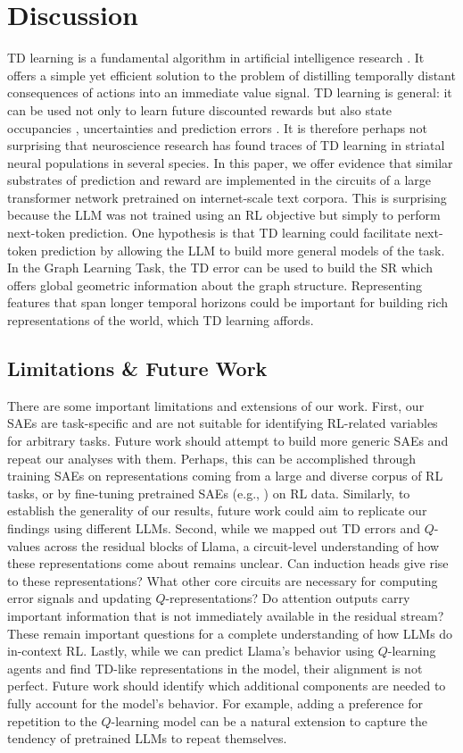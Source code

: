 \documentclass{article}
\begin{document}
\section{Discussion}
TD learning is a fundamental algorithm in artificial intelligence research \citep{sutton1987temporal,sutton_reinforcement_2018, mnih2015human}. It offers a simple yet efficient solution to the problem of distilling temporally distant consequences of actions into an immediate value signal. TD learning is general: it can be used not only to learn future discounted rewards but also state occupancies \citep{dayan_improving_1993}, uncertainties \citep{guez2012efficient} and prediction errors \citep{burda2018exploration, saanum2024reinforcement}. It is therefore perhaps not surprising that neuroscience research has found traces of TD learning in striatal neural populations in several species. In this paper, we offer evidence that similar substrates of prediction and reward are implemented in the circuits of a large transformer network pretrained on internet-scale text corpora. This is surprising because the LLM was not trained using an RL objective but simply to perform next-token prediction. One hypothesis is that TD learning could facilitate next-token prediction by allowing the LLM to build more general models of the task. In the Graph Learning Task, the TD error can be used to build the SR which offers global geometric information about the graph structure. Representing features that span longer temporal horizons could be important for building rich representations of the world, which TD learning affords.
\subsection{Limitations \& Future Work}
There are some important limitations and extensions of our work. First, our SAEs are task-specific and are not suitable for identifying RL-related variables for arbitrary tasks. Future work should attempt to build more generic SAEs and repeat our analyses with them. Perhaps, this can be accomplished through training SAEs on representations coming from a large and diverse corpus of RL tasks, or by fine-tuning pretrained SAEs (e.g., \citet{lieberum2024gemma}) on RL data. Similarly, to establish the generality of our results, future work could aim to replicate our findings using different LLMs.
Second, while we mapped out TD errors and $Q$-values across the residual blocks of Llama, a circuit-level understanding of how these representations come about remains unclear. Can induction heads \citep{olsson2022context} give rise to these representations? What other core circuits are necessary for computing error signals and updating $Q$-representations? Do attention outputs carry important information that is not immediately available in the residual stream? These remain important questions for a complete understanding of how LLMs do in-context RL.
Lastly, while we can predict Llama's behavior using $Q$-learning agents and find TD-like representations in the model, their alignment is not perfect. Future work should identify which additional components are needed to fully account for the model's behavior. For example, adding a preference for repetition to the $Q$-learning model can be a natural extension to capture the tendency of pretrained LLMs to repeat themselves.
\end{document}
